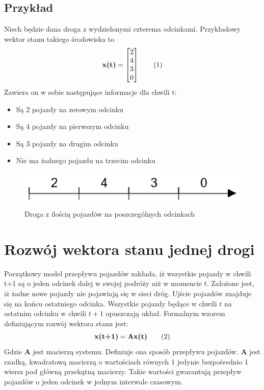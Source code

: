 \documentclass[12pt]{book}
\theoremstyle{plain}
\newcommand\addtag{\refstepcounter{equation}
\renewcommand{\labelenumii}{\theenumii}
\renewcommand{\theenumii}{\theenumi.\arabic{enumii}.}
\tag{\theequation}}
\begin{document}
\subsection{Przykład} \label{subsec:example-single-road}
Niech będzie dana droga z wydzielonymi czterema odcinkami. Przykładowy wektor stanu takiego środowiska to
\[\textbf{x(t)}=\begin{bmatrix}
2 \\ 4 \\ 3 \\ 0
\end{bmatrix} \addtag \]
Zawiera on w sobie następujące informacje dla chwili t:
\begin{itemize}
	\item Są 2 pojazdy na zerowym odcinku
	\item Są 4 pojazdy na pierwszym odcinku
	\item Są 3 pojazdy na drugim odcinku
	\item Nie ma żadnego pojazdu na trzecim odcinku
\end{itemize}

\begin{figure}[H]
	\centering
	\includegraphics[width=14cm]{images/1_droga_4_odcinki}
	\caption{Droga z ilością pojazdów na poszczególnych odcinkach}
	\label{fig:single_road}
\end{figure}
\section{Rozwój wektora stanu jednej drogi}
Początkowy model przepływu pojazdów zakłada, iż wszystkie pojazdy w chwili t+1 są o jeden odcinek dalej w swojej podróży niż w momencie $t$. Założone jest, iż żadne nowe pojazdy nie pojawiają się w sieci dróg. Ujście pojazdów znajduje się na końcu ostatniego odcinka. Wszystkie pojazdy będące w chwili $t$ na ostatnim odcinku w chwili $t+1$ opuszczają układ. Formalnym wzorem definiującym rozwój wektora stanu jest:
\[\textbf{x(t+1)}=\textbf{Ax(t)} \addtag \label{eq:single_road} \]
Gdzie $\textbf{A}$ jest macierzą systemu. Definiuje ona sposób przepływu pojazdów. $\textbf{A}$ jest rzadką, kwadratową macierzą o wartościach równych 1 jedynie bezpośrednio 1 wiersz pod główną przekątną macierzy. Takie wartości gwarantują przepływ pojazdów o jeden odcinek w jednym interwale czasowym.
\end{document}
